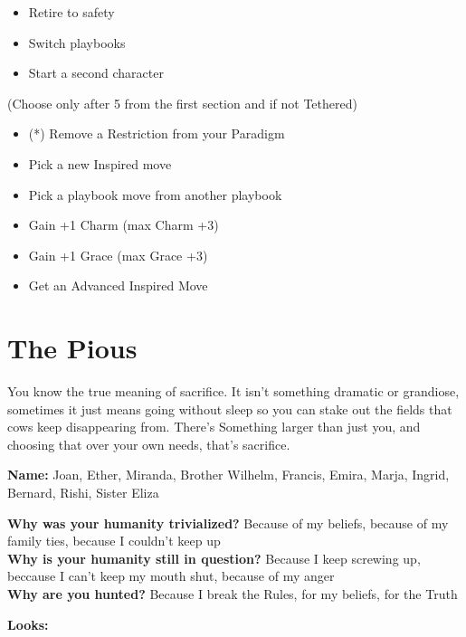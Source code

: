 \documentclass[
]{memoir}
\begin{document}
\begin{itemize}
\tightlist
\item
  Retire to safety
\item
  Switch playbooks
\item
  Start a second character
\end{itemize}

(Choose only after 5 from the first section and if not Tethered)

\begin{itemize}
\tightlist
\item
  (*) Remove a Restriction from your Paradigm
\item
  Pick a new Inspired move
\item
  Pick a playbook move from another playbook
\item
  Gain +1 Charm (max Charm +3)
\item
  Gain +1 Grace (max Grace +3)
\item
  Get an Advanced Inspired Move
\end{itemize}

\newpage

\hypertarget{the-pious}{%
\section{The Pious}\label{the-pious}}

You know the true meaning of sacrifice. It isn't something dramatic or
grandiose, sometimes it just means going without sleep so you can stake
out the fields that cows keep disappearing from. There's Something
larger than just you, and choosing that over your own needs, that's
sacrifice.

\textbf{Name:} Joan, Ether, Miranda, Brother Wilhelm, Francis, Emira,
Marja, Ingrid, Bernard, Rishi, Sister Eliza

\textbf{Why was your humanity trivialized?} Because of my beliefs,
because of my family ties, because I couldn't keep up\\
\textbf{Why is your humanity still in question?} Because I keep screwing
up, beccause I can't keep my mouth shut, because of my anger\\
\textbf{Why are you hunted?} Because I break the Rules, for my beliefs,
for the Truth

\textbf{Looks:}
\end{document}
